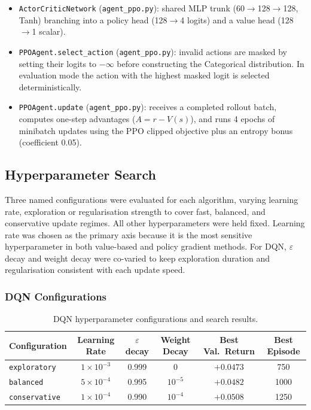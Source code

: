 \documentclass{article}
\begin{document}
\begin{itemize}

\item \texttt{ActorCriticNetwork} (\texttt{agent\_ppo.py}):
shared MLP trunk (60$\rightarrow$128$\rightarrow$128, Tanh) branching into a policy head
(128$\rightarrow$4 logits) and a value head (128$\rightarrow$1 scalar).

\item \texttt{PPOAgent.select\_action} (\texttt{agent\_ppo.py}):
invalid actions are masked by setting their logits to $-\infty$ before constructing the
Categorical distribution. In evaluation mode the action with the highest masked logit
is selected deterministically.

\item \texttt{PPOAgent.update} (\texttt{agent\_ppo.py}):
receives a completed rollout batch, computes one-step advantages ($A = r - V(s)$),
and runs 4 epochs of minibatch updates using the PPO clipped objective plus an entropy
bonus (coefficient 0.05).

\end{itemize}


\subsection{Hyperparameter Search}

Three named configurations were evaluated for each algorithm, varying learning rate,
exploration or regularisation strength to cover fast, balanced, and conservative update
regimes. All other hyperparameters were held fixed. Learning rate was chosen as the primary axis because it is the
most sensitive hyperparameter in both value-based and policy gradient methods. For DQN,
$\varepsilon$ decay and weight decay were co-varied to keep exploration duration and
regularisation consistent with each update speed. 

\subsubsection{DQN Configurations}

\begin{table}[H]
\centering
\caption{DQN hyperparameter configurations and search results.}
\begin{tabular}{lccccc}
\toprule
\textbf{Configuration} & \textbf{Learning Rate} & \textbf{$\varepsilon$ decay} & \textbf{Weight Decay} & \textbf{Best Val.\ Return} & \textbf{Best Episode} \\
\midrule
\texttt{exploratory}  & $1\times10^{-3}$ & 0.999 & $0$         & $+0.0473$ &  750 \\
\texttt{balanced}     & $5\times10^{-4}$ & 0.995 & $10^{-5}$   & $+0.0482$ & 1000 \\
\texttt{conservative} & $1\times10^{-4}$ & 0.990 & $10^{-4}$   & $+0.0508$ & 1250 \\
\bottomrule
\end{tabular}
\end{table}
\end{document}
